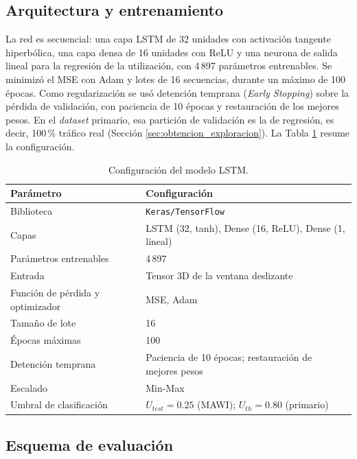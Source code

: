 \documentclass[12pt]{report}
\begin{document}
\subsection*{Arquitectura y entrenamiento}

La red es secuencial: una capa LSTM de 32 unidades con activación tangente hiperbólica, una capa densa de 16 unidades con ReLU y una neurona de salida lineal para la regresión de la utilización, con 4\,897 parámetros entrenables. Se minimizó el MSE con Adam y lotes de 16 secuencias, durante un máximo de 100 épocas. Como regularización se usó detención temprana (\textit{Early Stopping}) sobre la pérdida de validación, con paciencia de 10 épocas y restauración de los mejores pesos. En el \textit{dataset} primario, esa partición de validación es la de regresión, es decir, 100\,\% tráfico real (Sección \ref{sec:obtencion_exploracion}). La Tabla \ref{tab:config_lstm} resume la configuración.

\begin{table}[H]
    \centering
    \begin{tabular}{|l|p{6cm}|}
        \hline
        \textbf{Parámetro} & \textbf{Configuración} \\
        \hline
        Biblioteca & \texttt{Keras/TensorFlow} \\
        Capas & LSTM (32, tanh), Dense (16, ReLU), Dense (1, lineal) \\
        Parámetros entrenables & 4\,897 \\
        Entrada & Tensor 3D de la ventana deslizante \\
        Función de pérdida y optimizador & MSE, Adam \\
        Tamaño de lote & 16 \\
        Épocas máximas & 100 \\
        Detención temprana & Paciencia de 10 épocas; restauración de mejores pesos \\
        Escalado & Min-Max \\
        Umbral de clasificación & $U_{test}=0.25$ (MAWI); $U_{th}=0.80$ (primario) \\
        \hline
    \end{tabular}
    \caption{Configuración del modelo LSTM.}
    \label{tab:config_lstm}
\end{table}

\subsection*{Esquema de evaluación}
\end{document}
